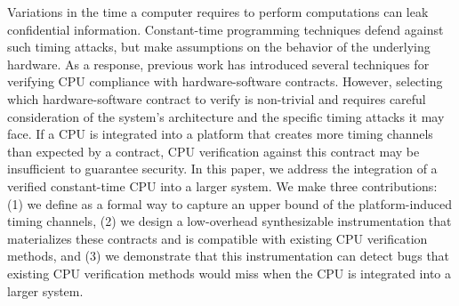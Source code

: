 Variations in the time a computer requires to perform computations can leak confidential information.
Constant-time programming techniques defend against such timing attacks, but make assumptions on the behavior of the underlying hardware.
As a response, previous work has introduced several techniques for verifying CPU compliance with hardware-software contracts.
%
However, selecting which hardware-software contract to verify is non-trivial and requires careful consideration of the system's architecture and the specific timing attacks it may face.
If a CPU is integrated into a platform that creates more timing channels than expected by a contract, CPU verification against this contract may be insufficient to guarantee security.
In this paper, we address the integration of a verified constant-time CPU into a larger system.
We make three contributions: (1) we define \pics as a formal way to capture an upper bound of the platform-induced timing channels, (2) we design a low-overhead synthesizable instrumentation that materializes these contracts and is compatible with existing CPU verification methods, and (3) we demonstrate that this instrumentation can detect bugs that existing CPU verification methods would miss when the CPU is integrated into a larger system.


